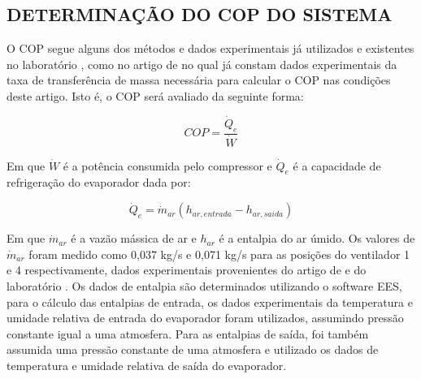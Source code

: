 \newpage
\subsection{\MakeUppercase{Determinação do COP do Sistema}} \label{subsec:Determinação do COP do Sistema}

O COP segue alguns dos métodos e dados experimentais já utilizados e existentes no laboratório \textcite{reve2023}, como no artigo de \textcite{ExperimentalThermalPerformance} no qual já constam dados experimentais da taxa de transferência de massa necessária para calcular o COP nas condições deste artigo. Isto é, o COP será avaliado da seguinte forma:

\begin{equation}
    COP = \frac{\dot Q_e}{\dot W}
    \label{eq:COP}
\end{equation}

Em que $\dot W$ é a potência consumida pelo compressor e $ \dot Q_e$ é a capacidade de refrigeração do evaporador dada por:

\begin{equation}
    \dot Q_e = \dot m_{ar}(h_{ar,entrada} - h_{ar,saida})
\end{equation}

Em que $\dot m_{ar}$ é a vazão mássica de ar e $h_{ar}$ é a entalpia do ar úmido. Os valores de $\dot m_{ar}$ foram medido como 0,037 kg/s e 0,071 kg/s para as posições do ventilador 1 e 4 respectivamente, dados experimentais provenientes do artigo de \textcite{ExperimentalThermalPerformance} e do laboratório \textcite{reve2023}. Os dados de entalpia são determinados utilizando o software EES, para o cálculo das entalpias de entrada, os dados experimentais da temperatura e umidade relativa de entrada do evaporador foram utilizados, assumindo pressão constante igual a uma atmosfera. Para as entalpias de saída, foi também assumida uma pressão constante de uma atmosfera e utilizado os dados de temperatura e umidade relativa de saída do evaporador. 